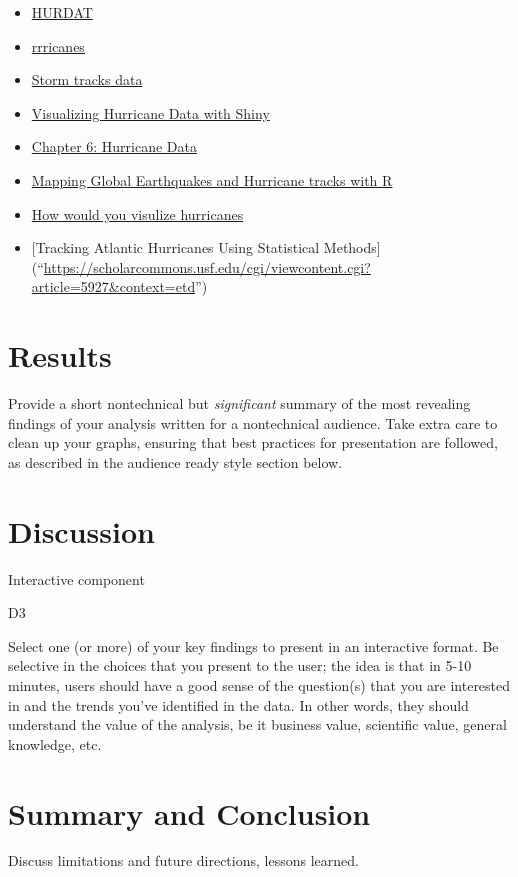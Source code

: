 \documentclass[]{book}
\begin{document}
\begin{itemize}
\item
  \href{\%22https://cran.r-project.org/web/packages/HURDAT/HURDAT.pdf}{HURDAT}
\item
  \href{\%22https://github.com/ropensci/rrricanes\%22}{rrricanes}
\item
  \href{\%22https://dplyr.tidyverse.org/reference/storms.html\%22}{Storm tracks data}
\item
  \href{\%22https://www.r-bloggers.com/visualizing-hurricane-data-with-shiny/\%22}{Visualizing Hurricane Data with Shiny}
\item
  \href{\%22https://rpubs.com/jelsner/4826\%22}{Chapter 6: Hurricane Data}
\item
  \href{\%22http://david-lallemant.com/mapping-global-earthquakes-and-hurricane-tracks-with-r-2/\%22}{Mapping Global Earthquakes and Hurricane tracks with R}
\item
  \href{\%22http://www.storytellingwithdata.com/blog/2017/10/1/how-youd-visualize-hurricanes\%22}{How would you visulize hurricanes}
\item
  {[}Tracking Atlantic Hurricanes Using Statistical Methods{]} (``\url{https://scholarcommons.usf.edu/cgi/viewcontent.cgi?article=5927\&context=etd}'')
\end{itemize}

\hypertarget{results}{%
\chapter{Results}\label{results}}

Provide a short nontechnical but \emph{significant} summary of the most revealing findings of your analysis written for a nontechnical audience. Take extra care to clean up your graphs, ensuring that best practices for presentation are followed, as described in the audience ready style section below.

\hypertarget{discussion}{%
\chapter{Discussion}\label{discussion}}

Interactive component

D3

Select one (or more) of your key findings to present in an interactive format. Be selective in the choices that you present to the user; the idea is that in 5-10 minutes, users should have a good sense of the question(s) that you are interested in and the trends you've identified in the data. In other words, they should understand the value of the analysis, be it business value, scientific value, general knowledge, etc.

\hypertarget{summary-and-conclusion}{%
\chapter{Summary and Conclusion}\label{summary-and-conclusion}}

Discuss limitations and future directions, lessons learned.


\end{document}
